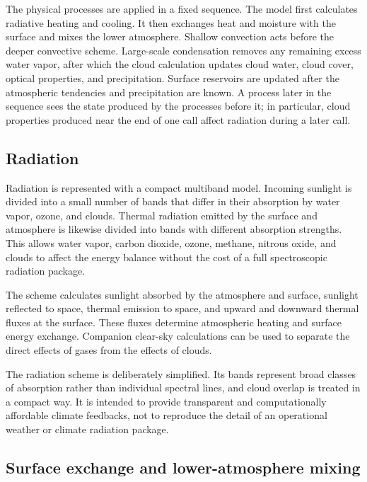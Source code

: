 The physical processes are applied in a fixed sequence.  The model first calculates radiative heating and cooling.  It then exchanges heat and moisture with the surface and mixes the lower atmosphere.  Shallow convection acts before the deeper convective scheme.  Large-scale condensation removes any remaining excess water vapor, after which the cloud calculation updates cloud water, cloud cover, optical properties, and precipitation.  Surface reservoirs are updated after the atmospheric tendencies and precipitation are known.  A process later in the sequence sees the state produced by the processes before it; in particular, cloud properties produced near the end of one call affect radiation during a later call.


\subsection{Radiation}

Radiation is represented with a compact multiband model.  Incoming sunlight is divided into a small number of bands that differ in their absorption by water vapor, ozone, and clouds.  Thermal radiation emitted by the surface and atmosphere is likewise divided into bands with different absorption strengths. This allows water vapor, carbon dioxide, ozone, methane, nitrous oxide, and clouds to affect the energy balance without the cost of a full spectroscopic radiation package.

The scheme calculates sunlight absorbed by the atmosphere and surface, sunlight reflected to space, thermal emission to space, and upward and downward thermal fluxes at the surface.  These fluxes determine atmospheric heating and surface energy exchange.  Companion clear-sky calculations can be used to separate the direct effects of gases from the effects of clouds.

The radiation scheme is deliberately simplified.  Its bands represent broad classes of absorption rather than individual spectral lines, and cloud overlap is treated in a compact way.  It is intended to provide transparent and computationally affordable climate feedbacks, not to reproduce the detail of an operational weather or climate radiation package.

\subsection{Surface exchange and lower-atmosphere mixing}

